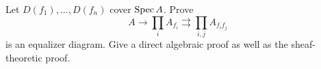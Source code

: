\begin{problem}\label{chal:vi17-c01}
Let $D(f_1),\dots,D(f_n)$ cover $\operatorname{Spec} A$.  Prove
\[
A\longrightarrow\prod_i A_{f_i}\rightrightarrows\prod_{i,j}A_{f_if_j}
\]
is an equalizer diagram.  Give a direct algebraic proof as well as the sheaf-theoretic proof.
\end{problem}
